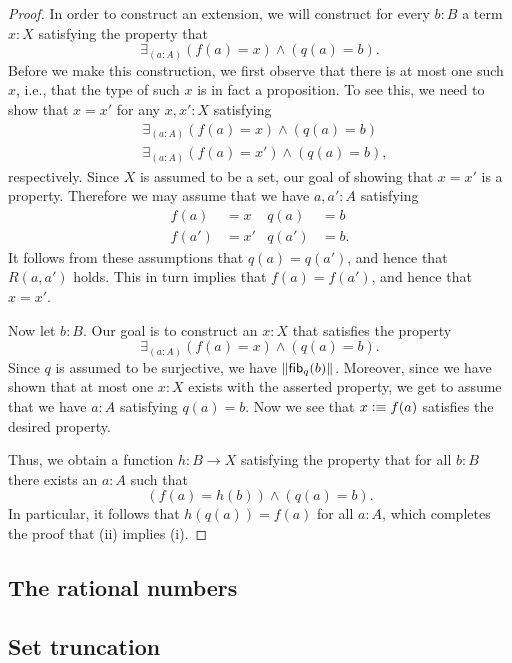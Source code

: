 \begin{proof}
  In order to construct an extension, we will construct for every $b:B$ a term $x:X$ satisfying the property that
  \begin{equation*}
    \exists_{(a:A)}(f(a)=x)\land (q(a)=b).
  \end{equation*}
  Before we make this construction, we first observe that there is at most one such $x$, i.e., that the type of such $x$ is in fact a proposition. To see this, we need to show that $x=x'$ for any $x,x':X$ satisfying 
  \begin{align*}
    & \exists_{(a:A)}(f(a)=x)\land (q(a)=b) \\
    & \exists_{(a:A)}(f(a)=x')\land (q(a)=b),
  \end{align*}
  respectively. Since $X$ is assumed to be a set, our goal of showing that $x=x'$ is a property. Therefore we may assume that we have $a,a':A$ satisfying
  \begin{align*}
    f(a) & = x & q(a) & = b \\
    f(a') & = x' & q(a') & = b.
  \end{align*}
  It follows from these assumptions that $q(a)=q(a')$, and hence that $R(a,a')$ holds. This in turn implies that $f(a)=f(a')$, and hence that $x=x'$.

  Now let $b:B$. Our goal is to construct an $x:X$ that satisfies the property
  \begin{equation*}
    \exists_{(a:A)}(f(a)=x)\land (q(a)=b).
  \end{equation*}
  Since $q$ is assumed to be surjective, we have $\Vert \mathsf{fib}_{q}(b)\Vert_{}$. Moreover, since we have shown that at most one $x:X$ exists with the asserted property, we get to assume that we have $a:A$ satisfying $q(a)=b$. Now we see that $x\vcentcolon\equiv f(a)$ satisfies the desired property.

  Thus, we obtain a function $h:B\to X$ satisfying the property that for all $b:B$ there exists an $a:A$ such that
  \begin{equation*}
    (f(a)=h(b))\land(q(a)=b).
  \end{equation*}
  In particular, it follows that $h(q(a))=f(a)$ for all $a:A$, which completes the proof that (ii) implies (i).  
\end{proof}

\subsection{The rational numbers}

\subsection{Set truncation}

